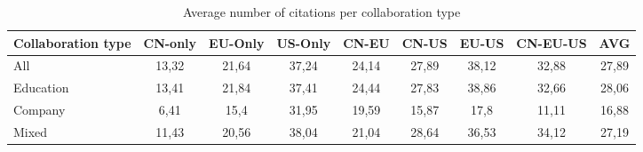 \begin{table}[]
    \centering
    \begin{tabular}{lcccccccc}
    \hline
    Collaboration type & CN-only & EU-Only & US-Only & CN-EU & CN-US & EU-US & CN-EU-US & AVG   \\ \hline
    All                & 13,32   & 21,64   & 37,24   & 24,14 & 27,89 & 38,12 & 32,88    & 27,89 \\
    Education          & 13,41   & 21,84   & 37,41   & 24,44 & 27,83 & 38,86 & 32,66    & 28,06 \\
    Company            & 6,41    & 15,4    & 31,95   & 19,59 & 15,87 & 17,8  & 11,11    & 16,88 \\
    Mixed              & 11,43   & 20,56   & 38,04   & 21,04 & 28,64 & 36,53 & 34,12    & 27,19 \\ \hline
    \end{tabular}
\caption{Average number of citations per collaboration type}
\label{table:avg_citations_by_collab_type}
\end{table}